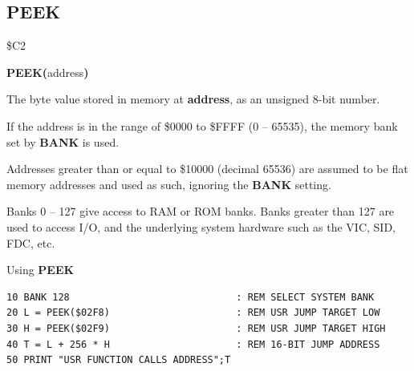 \subsection{PEEK}
\begin{description}[leftmargin=2cm,style=nextline]
\item [Token:]    \$C2

\item [Format:]   {\bf PEEK(}address{\bf)}

\item [Returns:]  The byte value stored in memory at {\bf address}, as an unsigned 8-bit number.

                  If the address is in the range of \$0000 to \$FFFF (0 -- 65535), the memory bank set by {\bf BANK} is used.

                  Addresses greater than or equal to \$10000 (decimal 65536) are assumed to be flat memory addresses and used as such, ignoring the {\bf BANK} setting.

\item [Remarks:]  Banks 0 -- 127 give access to RAM or ROM banks. Banks greater than 127 are used to access I/O, and the underlying system hardware such as the VIC, SID, FDC, etc.

\item [Example:]  Using {\bf PEEK}

\begin{tcolorbox}[colback=black,coltext=white]
\verbatimfont{\codefont}
\begin{verbatim}
10 BANK 128                             : REM SELECT SYSTEM BANK
20 L = PEEK($02F8)                      : REM USR JUMP TARGET LOW
30 H = PEEK($02F9)                      : REM USR JUMP TARGET HIGH
40 T = L + 256 * H                      : REM 16-BIT JUMP ADDRESS
50 PRINT "USR FUNCTION CALLS ADDRESS";T
\end{verbatim}
\end{tcolorbox}
\end{description}


\newpage
